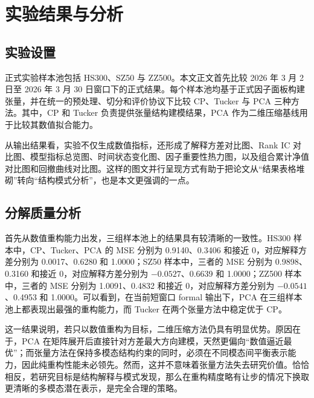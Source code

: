 \chapter{实验结果与分析}

\section{实验设置}

正式实验样本池包括 HS300、SZ50 与 ZZ500。本文正文首先比较 2026 年 3 月 2 日至 2026 年 3 月 30 日窗口下的正式结果。每个样本池均基于正式因子面板构建张量，并在统一的预处理、切分和评价协议下比较 CP、Tucker 与 PCA 三种方法。其中，CP 和 Tucker 负责提供张量结构建模结果，PCA 作为二维压缩基线用于比较其数值拟合能力。

从输出结果看，实验不仅生成数值指标，还形成了解释方差对比图、Rank IC 对比图、模型指标总览图、时间状态变化图、因子重要性热力图，以及组合累计净值对比图和回撤曲线对比图。这样的图文并行呈现方式有助于把论文从“结果表格堆砌”转向“结构模式分析”，也是本文更强调的一点。

\section{分解质量分析}

首先从数值重构能力出发，三组样本池上的结果具有较清晰的一致性。HS300 样本中，CP、Tucker、PCA 的 MSE 分别为 0.9140、0.3406 和接近 0，对应解释方差分别为 0.0017、0.6280 和 1.0000；SZ50 样本中，三者的 MSE 分别为 0.9898、0.3160 和接近 0，对应解释方差分别为 $-0.0527$、0.6639 和 1.0000；ZZ500 样本中，三者的 MSE 分别为 1.0091、0.4832 和接近 0，对应解释方差分别为 $-0.0541$、0.4953 和 1.0000。可以看到，在当前短窗口 formal 输出下，PCA 在三组样本池上都表现出最强的重构能力，而 Tucker 在两个张量方法中稳定优于 CP。

这一结果说明，若只以数值重构为目标，二维压缩方法仍具有明显优势。原因在于，PCA 在矩阵展开后直接针对方差最大方向建模，天然更偏向“数值逼近最优”；而张量方法在保持多模态结构约束的同时，必须在不同模态间平衡表示能力，因此纯重构性能未必领先。然而，这并不意味着张量方法失去研究价值。恰恰相反，若研究目标是结构解释与模式发现，那么在重构精度略有让步的情况下换取更清晰的多模态潜在表示，是完全合理的策略。

